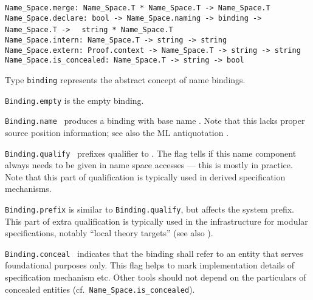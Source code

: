 \begin{isabellebody}
\begin{isamarkuptext}
\begin{mldecls}
  \verb|Name_Space.merge: Name_Space.T * Name_Space.T -> Name_Space.T| \\
  \verb|Name_Space.declare: bool -> Name_Space.naming -> binding -> Name_Space.T ->|\isasep\isanewline%
\verb|  string * Name_Space.T| \\
  \verb|Name_Space.intern: Name_Space.T -> string -> string| \\
  \verb|Name_Space.extern: Proof.context -> Name_Space.T -> string -> string| \\
  \verb|Name_Space.is_concealed: Name_Space.T -> string -> bool|
  \end{mldecls}

  \begin{description}

  \item Type \verb|binding| represents the abstract concept of
  name bindings.

  \item \verb|Binding.empty| is the empty binding.

  \item \verb|Binding.name|~ produces a binding with base
  name .  Note that this lacks proper source position
  information; see also the ML antiquotation \hyperlink{ML antiquotation.binding}{\mbox{}}.

  \item \verb|Binding.qualify|~
  prefixes qualifier  to .  The  flag tells if this name component always needs to be
  given in name space accesses --- this is mostly  in
  practice.  Note that this part of qualification is typically used in
  derived specification mechanisms.

  \item \verb|Binding.prefix| is similar to \verb|Binding.qualify|, but
  affects the system prefix.  This part of extra qualification is
  typically used in the infrastructure for modular specifications,
  notably ``local theory targets'' (see also ).

  \item \verb|Binding.conceal|~ indicates that the
  binding shall refer to an entity that serves foundational purposes
  only.  This flag helps to mark implementation details of
  specification mechanism etc.  Other tools should not depend on the
  particulars of concealed entities (cf.\ \verb|Name_Space.is_concealed|).


\end{description}
\end{isamarkuptext}
\end{isabellebody}
